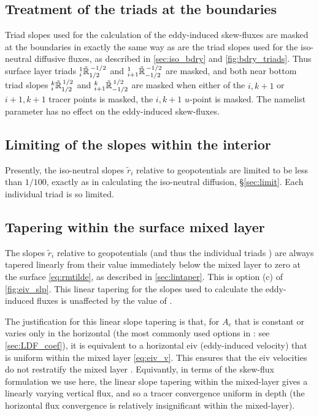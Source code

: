 \documentclass[../main/NEMO_manual]{subfiles}
\begin{document}
\subsection{Treatment of the triads at the boundaries}
\label{sec:skew_bdry}

Triad slopes  used for the calculation of the eddy-induced skew-fluxes are masked at the boundaries 
in exactly the same way as are the triad slopes  used for the iso-neutral diffusive fluxes, 
as described in \autoref{sec:iso_bdry} and \autoref{fig:bdry_triads}. 
Thus surface layer triads ${}_{i}^{1}{\tilde{\mathbb{R}}}_{1/2}^{\,-1/2}$ and ${}_{i+1}^{1}{\tilde{\mathbb{R}}}_{-1/2}^{\,-1/2}$ are masked, 
and both near bottom triad slopes ${}_{i}^{k}{\tilde{\mathbb{R}}}_{1/2}^{\,1/2}$ and ${}_{i+1}^{k}{\tilde{\mathbb{R}}}_{-1/2}^{\,1/2}$ are masked when 
either of the $i,k+1$ or $i+1,k+1$ tracer points is masked, \ie the $i,k+1$ $u$-point is masked. 
The namelist parameter  has no effect on the eddy-induced skew-fluxes.

\subsection{Limiting of the slopes within the interior}
\label{sec:limitskew}

Presently, the iso-neutral slopes $\tilde{r}_i$ relative to geopotentials are limited to be less than $1/100$, 
exactly as in calculating the iso-neutral diffusion, \S \autoref{sec:limit}. 
Each individual triad  is so limited.

\subsection{Tapering within the surface mixed layer}
\label{sec:taperskew}

The slopes $\tilde{r}_i$ relative to geopotentials (and thus the individual triads ) 
are always tapered linearly from their value immediately below the mixed layer to zero at the surface 
\autoref{eq:rmtilde}, as described in \autoref{sec:lintaper}. 
This is option (c) of \autoref{fig:eiv_slp}. 
This linear tapering for the slopes used to calculate the eddy-induced fluxes is unaffected by 
the value of .

The justification for this linear slope tapering is that, for $A_e$ that is constant or varies only in
the horizontal (the most commonly used options in \NEMO: see \autoref{sec:LDF_coef}),
it is equivalent to a horizontal eiv (eddy-induced velocity) that is uniform within the mixed layer
\autoref{eq:eiv_v}.
This ensures that the eiv velocities do not restratify the mixed layer \citep{Treguier1997,Danabasoglu_al_2008}.
Equivantly, in terms of the skew-flux formulation we use here,
the linear slope tapering within the mixed-layer gives a linearly varying vertical flux,
and so a tracer convergence uniform in depth
(the horizontal flux convergence is relatively insignificant within the mixed-layer).
\end{document}
